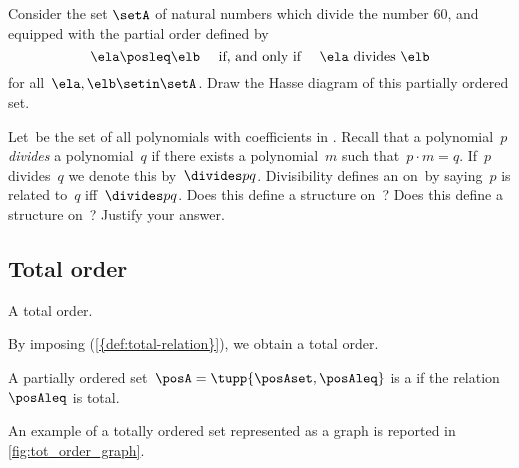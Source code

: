 \begin{gradedexercise}
    Consider the set $\setA$ of natural numbers which divide the number 60, and equipped with the partial order defined by
    \begin{equation}
        \ela \posleq \elb \quad \text{ if, and only if } \quad \ela \text{ divides } \elb
    \end{equation}
    for all~$\ela, \elb \setin \setA$.
    Draw the Hasse diagram of this partially ordered set.
\end{gradedexercise}

\begin{gradedexercise}
    \label{ex:PolynomialDivisibility}
    Let~\setA be the set of all polynomials with coefficients in \reals.
    Recall that a polynomial~$p$ \emph{divides} a polynomial~$q$ if there exists a polynomial~$m$ such that~$p \cdot m = q$.
    If~$p$ divides~$q$ we denote this by~$\divides p q$.
    Divisibility defines an  on~\setA by saying~$p$ is related to~$q$ iff~$\divides p q$.
    Does this define a  structure on~\setA?
    Does this define a  structure on~\setA?
    Justify your answer.
\end{gradedexercise}

\vfill

\subsection{Total order}

\begin{marginfigure}
    \centering
    \caption{A total order.}
    \label{fig:tot_order_graph}
\end{marginfigure}
By imposing \emph{} (\cref{{def:total-relation}}), we obtain a total order.

\begin{ctdefinition}
    \label{def:total-order}
    A partially ordered set~$\posA = \tupp{\posAset,\posAleq}$ is a  if the relation~$\posAleq$ is total.
\end{ctdefinition}

An example of a totally ordered set represented as a graph is reported in \cref{fig:tot_order_graph}.

